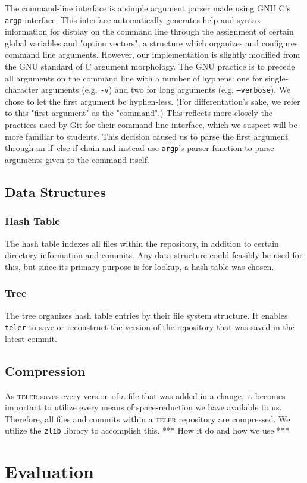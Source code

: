 \documentclass[12pt, letterpaper]{article}
\begin{document}
The command-line interface is a simple argument parser made using GNU C's
\texttt{argp} interface. This interface automatically generates help and syntax
information for display on the command line through the assignment of certain
global variables and "option vectors", a structure which organizes and
configures command line arguments. However, our implementation is slightly
modified from the GNU standard of C argument morphology. The GNU practice is to
precede all arguments on the command line with a number of hyphens: one for
single-character arguments (e.g. \texttt{-v}) and two for long arguments (e.g.
\texttt{--verbose}). We chose to let the first argument be hyphen-less. (For
differentation's sake, we refer to this "first argument" as the "command".) This
reflects more closely the practices used by Git for their command line
interface, which we suspect will be more familiar to students. This decision
caused us to parse the first argument through an if--else if chain and instead
use \texttt{argp}'s parser function to parse arguments given to the command
itself.

\subsection{Data Structures}
\label{subsec:datastructures}

\subsubsection{Hash Table}
\label{subsubsec:datastructures}

The hash table indexes all files within the repository, in addition to certain
directory information and commits. Any data structure could feasibly be used for
this, but since its primary purpose is for lookup, a hash table was chosen.

\subsubsection{Tree}
\label{subsubsec:tree}

The tree organizes hash table entries by their file system structure. It enables
\texttt{teler} to save or reconstruct the version of the repository that was
saved in the latest commit.

\subsection{Compression}
\label{subsec:compression}

As \textsc{teler} saves every version of a file that was added in a change, it
becomes important to utilize every means of space-reduction we have available to
us. Therefore, all files and commits within a \textsc{teler} repository are
compressed. We utilize the \texttt{zlib} library to accomplish this. *** How it
do and how we use ***



\section{Evaluation}
\label{sec:evaluation}
\end{document}

